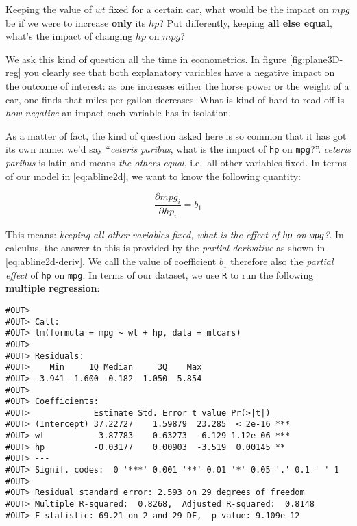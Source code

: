 \documentclass[]{book}
\newenvironment{tip}{\begin{tcolorbox}[colback=green!5!white,colframe=green]}{\end{tcolorbox}}
\begin{document}
\begin{tip}
Keeping the value of \(wt\) fixed for a certain car, what would be the
impact on \(mpg\) be if we were to increase \textbf{only} its \(hp\)?
Put differently, keeping \textbf{all else equal}, what's the impact of
changing \(hp\) on \(mpg\)?
\end{tip}

 We ask this kind of question all the time in econometrics. In figure
\ref{fig:plane3D-reg} you clearly see that both explanatory variables
have a negative impact on the outcome of interest: as one increases
either the horse power or the weight of a car, one finds that miles per
gallon decreases. What is kind of hard to read off is \emph{how
negative} an impact each variable has in isolation.

As a matter of fact, the kind of question asked here is so common that
it has got its own name: we'd say ``\emph{ceteris paribus}, what is the
impact of \texttt{hp} on \texttt{mpg}?''. \emph{ceteris paribus} is
latin and means \emph{the others equal}, i.e.~all other variables fixed.
In terms of our model in \eqref{eq:abline2d}, we want to know the
following quantity:

\begin{equation}
\frac{\partial mpg_i}{\partial hp_i} = b_1 \label{eq:abline2d-deriv}
\end{equation}

This means: \emph{keeping all other variables fixed, what is the effect
of \texttt{hp} on \texttt{mpg}?}. In calculus, the answer to this is
provided by the \emph{partial derivative} as shown in
\eqref{eq:abline2d-deriv}. We call the value of coefficient \(b_1\)
therefore also the \emph{partial effect} of \texttt{hp} on \texttt{mpg}.
In terms of our dataset, we use \texttt{R} to run the following
\textbf{multiple regression}:

\begin{verbatim}
#OUT> 
#OUT> Call:
#OUT> lm(formula = mpg ~ wt + hp, data = mtcars)
#OUT> 
#OUT> Residuals:
#OUT>    Min     1Q Median     3Q    Max 
#OUT> -3.941 -1.600 -0.182  1.050  5.854 
#OUT> 
#OUT> Coefficients:
#OUT>             Estimate Std. Error t value Pr(>|t|)    
#OUT> (Intercept) 37.22727    1.59879  23.285  < 2e-16 ***
#OUT> wt          -3.87783    0.63273  -6.129 1.12e-06 ***
#OUT> hp          -0.03177    0.00903  -3.519  0.00145 ** 
#OUT> ---
#OUT> Signif. codes:  0 '***' 0.001 '**' 0.01 '*' 0.05 '.' 0.1 ' ' 1
#OUT> 
#OUT> Residual standard error: 2.593 on 29 degrees of freedom
#OUT> Multiple R-squared:  0.8268,  Adjusted R-squared:  0.8148 
#OUT> F-statistic: 69.21 on 2 and 29 DF,  p-value: 9.109e-12
\end{verbatim}
\end{document}
